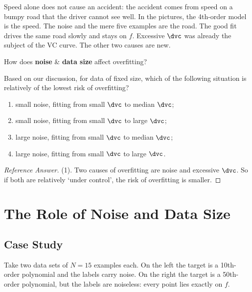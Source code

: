 Speed alone does not cause an accident: the accident comes from speed on a
bumpy road that the driver cannot see well. In the pictures, the 4th-order
model is the speed. The noise and the mere five examples are the road. The
good fit drives the same road slowly and stays on \(f\). Excessive
\(\dvc\) was already the subject of the VC curve. The other two causes are new.

\begin{question}
    How does \textbf{noise} \& \textbf{data size} affect overfitting?
\end{question}

\begin{exercise}
    Based on our discussion, for data of fixed size, which of the following
    situation is relatively of the lowest risk of overfitting?
    \begin{enumerate}[(1)]
        \item small noise, fitting from small \(\dvc\) to median \(\dvc\);
        \item small noise, fitting from small \(\dvc\) to large \(\dvc\);
        \item large noise, fitting from small \(\dvc\) to median \(\dvc\);
        \item large noise, fitting from small \(\dvc\) to large \(\dvc\).
    \end{enumerate}
\end{exercise}

\begin{proof}[Reference Answer]
    (1). Two causes of overfitting are noise and excessive \(\dvc\). So if
    both are relatively `under control', the risk of overfitting is smaller.
\end{proof}

\section{The Role of Noise and Data Size}\label{sec:noise-data-size}


\subsection{Case Study}

Take two data sets of \(N = 15\) examples each. On the left the target is a
10th-order polynomial and the labels carry noise. On the
right the target is a 50th-order polynomial, but the labels are
noiseless: every point lies exactly on \(f\).

